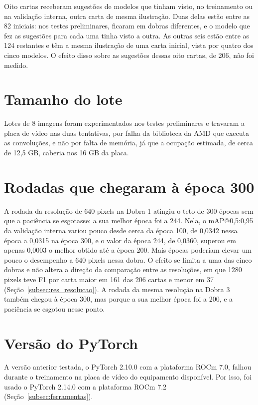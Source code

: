 \documentclass[
    12pt,                %
    openright,           %
    oneside,             %
    a4paper,             %
    english,             %
    brazil               %
]{abntex2}
\begin{document}
\begin{apendicesenv}
Oito cartas receberam sugestões de modelos que tinham visto, no
treinamento ou na validação interna, outra carta de mesma ilustração.
Duas delas estão entre as 82 iniciais: nos testes preliminares,
ficaram em dobras diferentes, e o modelo que fez as sugestões para cada
uma tinha visto a outra. As outras seis estão entre as 124 restantes e
têm a mesma ilustração de uma carta inicial, vista por quatro dos cinco
modelos. O efeito disso sobre as sugestões dessas oito cartas, de 206,
não foi medido.

\section{Tamanho do lote}

Lotes de 8 imagens foram experimentados nos testes preliminares e
travaram a placa de vídeo nas duas tentativas, por falha da biblioteca
da AMD que executa as convoluções, e não por falta de memória, já que a
ocupação estimada, de cerca de 12,5 GB, caberia nos 16 GB da placa.

\section{Rodadas que chegaram à época 300}

A rodada da resolução de 640 pixels na Dobra 1 atingiu o teto de 300
épocas sem que a paciência se esgotasse: a sua melhor época foi a 244.
Nela, o mAP@0,5:0,95 da validação interna variou pouco desde cerca da
época 100, de 0,0342 nessa época a 0,0315 na época 300, e o valor da
época 244, de 0,0360, superou em apenas 0,0003 o melhor obtido até a
época 200. Mais épocas poderiam elevar um pouco o desempenho a 640
pixels nessa dobra. O efeito se limita a uma das cinco dobras e não
altera a direção da comparação entre as resoluções, em que 1280 pixels
teve F1 por carta maior em 161 das 206 cartas e menor em 37
(Seção~\ref{subsec:res_resolucao}). A rodada da mesma resolução na
Dobra 3 também chegou à época 300, mas porque a sua melhor época foi a
200, e a paciência se esgotou nesse ponto.

\section{Versão do PyTorch}

A versão anterior testada, o PyTorch 2.10.0 com a plataforma ROCm 7.0,
falhou durante o treinamento na placa de vídeo do equipamento
disponível. Por isso, foi usado o PyTorch 2.14.0 com a plataforma
ROCm 7.2 (Seção~\ref{subsec:ferramentas}).


\end{apendicesenv}
\end{document}
